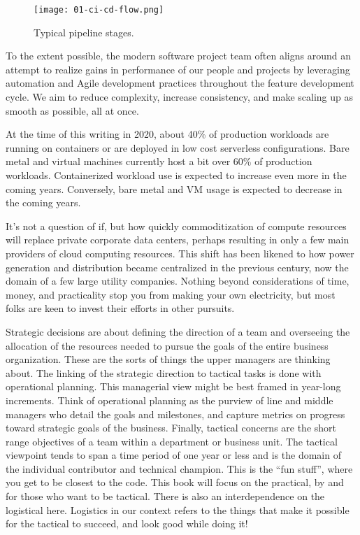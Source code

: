 \begin{figure}[!htb]
	\centering
	\texttt{[image: 01-ci-cd-flow.png]}
	\caption{Typical pipeline stages.}
\label{stages}
\end{figure}

\justifying
To the extent possible, the modern software project team often aligns around an
attempt to realize gains in performance of our people and projects by
leveraging automation and Agile development practices throughout the
feature development cycle. We aim to reduce complexity, increase consistency, and make scaling up as smooth as possible, all at once.

\justifying
At the time of this writing in 2020, about 40\% of production workloads are
running on containers or are deployed in low cost serverless configurations.
Bare metal and virtual machines currently host a bit over 60\% of production
workloads. Containerized workload use is expected to increase even more in
the coming years. Conversely, bare metal and VM usage is expected to
decrease in the coming years. \cite{cnative}

\justifying
It's not a question of if, but how quickly commoditization of compute resources
will replace private corporate data centers, perhaps resulting in only a
few main providers of cloud computing resources. This shift has been likened
to how power generation and distribution became centralized
in the previous century, now the domain of a few large utility companies.
Nothing beyond considerations of time, money, and practicality stop you
from making your own electricity, but most folks are keen to invest their
efforts in other pursuits.

\justifying
Strategic decisions are about defining the direction of a team and overseeing
the allocation of the resources needed to pursue the goals of the entire
business organization. These are the sorts of things the upper managers are
thinking about. The linking of the strategic direction to tactical tasks is
done with operational planning. This managerial view might be best framed in
year-long increments. Think of operational planning as the purview of line
and middle managers who detail the goals and milestones, and capture metrics
on progress toward strategic goals of the business. Finally, tactical concerns
are the short range objectives of a team within a department or business unit.
The tactical viewpoint tends to span a time period of one year or less and is
the domain of the individual contributor and technical champion. This is the
``fun stuff'', where you get to be closest to the code. This book will focus
on the practical, by and for those who want to be tactical. There is also
an interdependence on the logistical here. Logistics in our context refers to
the things that make it possible for the tactical to succeed, and look good
while doing it!

